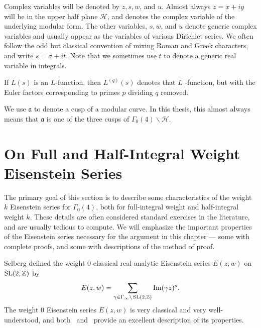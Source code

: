 Complex variables will be denoted by $z,s,w$, and $u$.
Almost always $z = x + iy$ will be in the upper half plane $\mathcal{H}$, and denotes the complex
variable of the underlying modular form.
The other variables, $s,w$, and $u$ denote generic complex variables and usually appear as
the variables of various Dirichlet series.
We often follow the odd but classical convention of mixing Roman and Greek characters, and
write $s = \sigma + it$.
Note that we sometimes use $t$ to denote a generic real variable in integrals.


If $L(s)$ is an $L$-function, then $L^{(q)}(s)$ denotes that $L$ -function, but with the
Euler factors corresponding to primes $p$ dividing $q$ removed.


We use $\mathfrak{a}$ to denote a cusp of a modular curve.
In this thesis, this almost always means that $\mathfrak{a}$ is one of the three cusps of
$\Gamma_0(4) \backslash \mathcal{H}$.




\section{On Full and Half-Integral Weight Eisenstein Series}\label{sec:Eisen_summary}


The primary goal of this section is to describe some characteristics of the weight $k$
Eisenstein series for $\Gamma_0(4)$, both for full-integral weight and half-integral
weight $k$.
These details are often considered standard exercises in the literature, and are usually
tedious to compute.
We will emphasize the important properties of the Eisenstein series necessary for the
argument in this chapter --- some with complete proofs, and some with descriptions of the
method of proof.


Selberg defined the weight $0$ classical real analytic Eisenstein series $E(z,w)$ on
$\operatorname{SL}(2, \mathbb{Z})$ by
\begin{equation}
  E(z,w) = \sum_{\gamma \in \Gamma_\infty \backslash \operatorname{SL}(2, \mathbb{Z})} \operatorname{Im} (\gamma z)^s.
\end{equation}
The weight $0$ Eisenstein series $E(z,w)$ is very classical and very well-understood, and
both~\cite[Chapter 3]{Goldfeld2006automorphic} and~\cite[Chapter 13]{Iwaniec97} provide an
excellent description of its properties.


